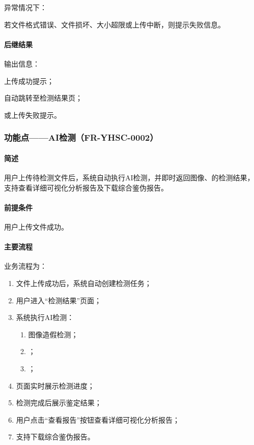 异常情况下：

若文件格式错误、文件损坏、大小超限或上传中断，则提示失败信息。

\paragraph*{后继结果}

输出信息：

上传成功提示；

自动跳转至检测结果页；

或上传失败提示。

\subsubsection{功能点——AI检测（FR-YHSC-0002）}

\paragraph*{简述}

用户上传待检测文件后，系统自动执行AI检测，并即时返回图像、的检测结果，支持查看详细可视化分析报告及下载综合鉴伪报告。

\paragraph*{前提条件}

用户上传文件成功。

\paragraph*{主要流程}

业务流程为：

\begin{enumerate}
    \item 文件上传成功后，系统自动创建检测任务；
    \item 用户进入“检测结果”页面；
    \item 系统执行AI检测：
    \begin{enumerate}
        \item 图像造假检测；
        \item {}；
        \item {}；
    \end{enumerate}
    \item 页面实时展示检测进度；
    \item 检测完成后展示鉴定结果；
    \item 用户点击“查看报告”按钮查看详细可视化分析报告；
    \item 支持下载综合鉴伪报告。
\end{enumerate}


